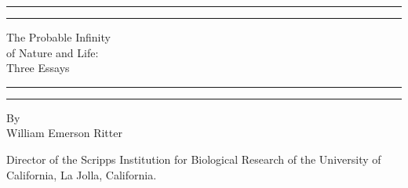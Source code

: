 \documentclass[a4paper, 11pt, oneside, polutonikogreek, english]{article}
\begin{document}
\begin{titlepage} %
	\centering %
	\scshape %

	
	\rule{\textwidth}{1.6pt}\vspace*{-\baselineskip}\vspace*{2pt} %
	\rule{\textwidth}{0.4pt} %
	
	\vspace{0.75\baselineskip} %

        {\LARGE The Probable Infinity \\of Nature and Life: \\Three Essays \\} %
	
	\vspace{0.75\baselineskip} %
	
	\rule{\textwidth}{0.4pt}\vspace*{-\baselineskip}\vspace{3.2pt} %
	\rule{\textwidth}{1.6pt} %
	
	\vspace{1\baselineskip} %
	
	
	{By \\\Large William Emerson Ritter\\} %
	
	\vspace*{1\baselineskip} %
	

        {\small Director of the Scripps Institution for Biological Research of the University of California, La Jolla, California.}
        
	
	

\end{titlepage}
\end{document}
